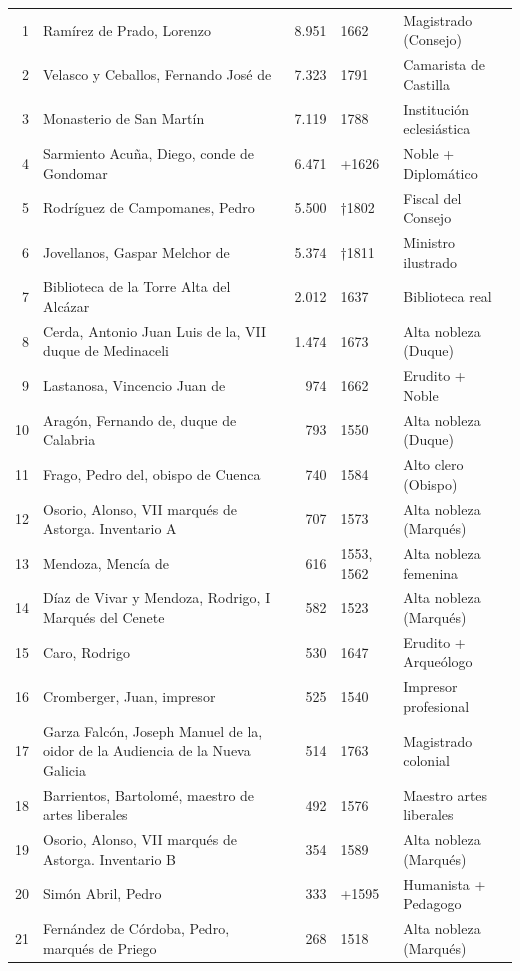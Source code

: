 \documentclass[12pt,a4paper]{article}
\begin{document}
\begin{longtable}{rlrll}
\rowcolor{yellow!20}
1 & Ramírez de Prado,  Lorenzo & 8.951 & 1662 & Magistrado (Consejo) \\
\rowcolor{yellow!20}
2 & Velasco y Ceballos, Fernando José de & 7.323 & 1791 & Camarista de Castilla \\
\rowcolor{yellow!20}
3 & Monasterio de San Martín & 7.119 & 1788 & Institución eclesiástica \\
\rowcolor{yellow!20}
4 & Sarmiento Acuña,  Diego, conde de Gondomar & 6.471 & +1626 & Noble + Diplomático \\
\rowcolor{yellow!20}
5 & Rodríguez de Campomanes, Pedro & 5.500 & †1802 & Fiscal del Consejo \\
\rowcolor{yellow!20}
6 & Jovellanos, Gaspar Melchor de & 5.374 & †1811 & Ministro ilustrado \\
7 & Biblioteca de la Torre Alta del Alcázar & 2.012 & 1637 & Biblioteca real \\
8 & Cerda, Antonio Juan Luis de la, VII duque de Medinaceli & 1.474 & 1673 & Alta nobleza (Duque) \\
9 & Lastanosa, Vincencio Juan de & 974 & 1662 & Erudito + Noble \\
10 & Aragón, Fernando de, duque de Calabria & 793 & 1550 & Alta nobleza (Duque) \\
11 & Frago, Pedro del, obispo de Cuenca & 740 & 1584 & Alto clero (Obispo) \\
12 & Osorio, Alonso, VII marqués de Astorga. Inventario A & 707 & 1573 & Alta nobleza (Marqués) \\
13 & Mendoza, Mencía de & 616 & 1553, 1562 & Alta nobleza femenina \\
14 & Díaz de Vivar y Mendoza, Rodrigo, I Marqués del Cenete & 582 & 1523 & Alta nobleza (Marqués) \\
15 & Caro, Rodrigo & 530 & 1647 & Erudito + Arqueólogo \\
16 & Cromberger, Juan, impresor & 525 & 1540 & Impresor profesional \\
17 & Garza Falcón, Joseph Manuel de la, oidor de la Audiencia de la Nueva Galicia & 514 & 1763 & Magistrado colonial \\
18 & Barrientos, Bartolomé, maestro de artes liberales & 492 & 1576 & Maestro artes liberales \\
19 & Osorio, Alonso, VII marqués de Astorga. Inventario B & 354 & 1589 & Alta nobleza (Marqués) \\
20 & Simón Abril, Pedro & 333 & +1595 & Humanista + Pedagogo \\
21 & Fernández de Córdoba, Pedro, marqués de Priego & 268 & 1518 & Alta nobleza (Marqués) \\

\end{longtable}
\end{document}
